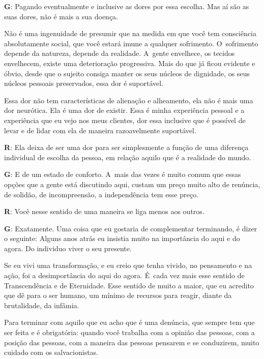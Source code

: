  

\textbf{G}: Pagando eventualmente e inclusive as dores por essa escolha.
Mas aí são as suas dores, não é mais a sua doença.

 

Não é uma ingenuidade de presumir que na medida em que você tem
consciência absolutamente social, que você estará imune a qualquer
sofrimento. O~sofrimento depende da natureza, depende da realidade. A~gente envelhece, os tecidos envelhecem, existe uma deterioração
progressiva. Mais do que já ficou evidente e óbvio, desde que o
sujeito consiga manter os seus núcleos de dignidade, os seus núcleos
pessoais preservados, essa dor é suportável.

 

Essa dor não tem características de alienação e alheamento, ela não é
mais uma dor neurótica. Ela é uma dor de existir. Essa é minha
experiência pessoal e a experiência que eu vejo nos meus clientes, dor
essa inclusive que é possível de levar e de lidar com ela de maneira
razoavelmente suportável.

 

\textbf{R}: Ela deixa de ser uma dor para ser simplesmente a função de
uma diferença individual de escolha da pessoa, em relação aquilo que é a
realidade do mundo.

 

\textbf{G}: E de um estado de conforto. A~mais das vezes é muito comum
que essas opções que a gente está discutindo aqui, custam um preço muito
alto de renúncia, de solidão, de incompreensão, a independência tem esse
preço.

 

\textbf{R}: Você nesse sentido de uma maneira se liga menos aos outros.

 

\textbf{G}: Exatamente. Uma coisa que eu gostaria de complementar
terminando, é dizer o seguinte: Alguns anos atrás eu insistia muito na
importância do aqui e do agora. Do individuo viver o seu presente.

 

Se eu vivi uma transformação, e eu creio que tenha vivido, no pensamento
e na ação, foi a desimportância do aqui do agora. É~cada vez mais esse
sentido de Transcendência e de Eternidade. Esse sentido de muito a
maior, que eu acredito que dê para o ser humano, um mínimo de recursos
para reagir, diante da brutalidade, da infâmia.

 

Para terminar com aquilo que eu acho que é uma denúncia, que sempre tem
que ser feita e é obrigatória: quando você trabalha com a opinião das
pessoas, com a posição das pessoas, com a maneira das pessoas pensarem e
se conduzirem, muito cuidado com os salvacionistas.

